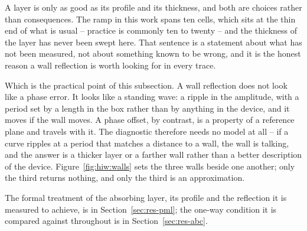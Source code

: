A layer is only as good as its profile and its thickness, and both are choices rather than consequences. The
ramp in this work spans ten cells, which sits at the thin end of what is usual -- practice is commonly ten to
twenty -- and the thickness of the layer has never been swept here. That sentence is a statement about what has
not been measured, not about something known to be wrong, and it is the honest reason a wall reflection is
worth looking for in every trace.

Which is the practical point of this subsection. A wall reflection does not look like a phase error. It looks
like a standing wave: a ripple in the amplitude, with a period set by a length in the box rather than by
anything in the device, and it moves if the wall moves. A phase offset, by contrast, is a property of a
reference plane and travels with it. The diagnostic therefore needs no model at all -- if a curve ripples at a
period that matches a distance to a wall, the wall is talking, and the answer is a thicker layer or a farther
wall rather than a better description of the device. Figure~\ref{fig:hiw:walls} sets the three walls beside
one another; only the third returns nothing, and only the third is an approximation.

The formal treatment of the absorbing layer, its profile and the reflection it is measured to achieve, is in
Section~\ref{sec:res-pml}; the one-way condition it is compared against throughout is in
Section~\ref{sec:res-abc}.

